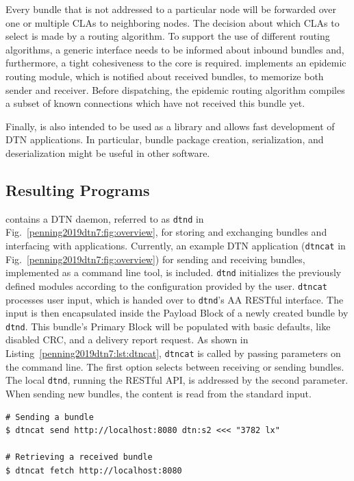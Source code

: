 Every bundle that is not addressed to a particular node will be forwarded over one or multiple CLAs to neighboring nodes.
The decision about which CLAs to select is made by a routing algorithm.
To support the use of different routing algorithms, a generic interface needs to be informed about inbound bundles and, furthermore, a tight cohesiveness to the core is required.
\dtn implements an epidemic routing module, which is notified about received bundles, to memorize both sender and receiver.
Before dispatching, the epidemic routing algorithm compiles a subset of known connections which have not received this bundle yet.

Finally, \dtn is also intended to be used as a library and allows fast development of DTN applications. In particular, bundle package creation, serialization, and deserialization  might be useful in other software.


\subsection{Resulting Programs}

\dtn contains a DTN daemon, referred to as \texttt{dtnd} in Fig.~\ref{penning2019dtn7:fig:overview}, for storing and exchanging bundles and interfacing with applications. Currently, an example DTN application (\texttt{dtncat} in Fig.~\ref{penning2019dtn7:fig:overview}) for sending and receiving bundles, implemented as a command line tool, is included. 
\texttt{dtnd} initializes the previously defined modules according to the configuration provided by the user.
\texttt{dtncat} processes user input, which is handed over to \texttt{dtnd}'s AA RESTful interface.
The input is then encapsulated inside the Payload Block of a newly created bundle by \texttt{dtnd}. This bundle's Primary Block will be populated with basic defaults, like disabled CRC, and a delivery report request.
As shown in Listing~\ref{penning2019dtn7:lst:dtncat}, \texttt{dtncat} is called by passing parameters on the command line. 
The first option selects between receiving or sending bundles.
The local \texttt{dtnd}, running the RESTful API, is addressed by the second parameter. 
When sending new bundles, the content is read from the standard input.

\begin{lstlisting}[caption={\texttt{dtncat} example}, captionpos={b}, label={penning2019dtn7:lst:dtncat}]
# Sending a bundle
$ dtncat send http://localhost:8080 dtn:s2 <<< "3782 lx"

# Retrieving a received bundle 
$ dtncat fetch http://localhost:8080 
\end{lstlisting}

